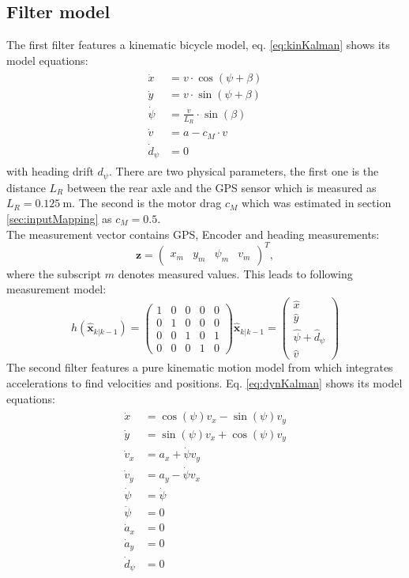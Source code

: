 \subsection{Filter model}
The first filter features a kinematic bicycle model, eq. \ref{eq:kinKalman} shows its model equations:
\begin{align}
\begin{split}\label{eq:kinKalman}
    \dot x &= v \cdot \cos (\psi + \beta)\\
    \dot y &= v \cdot \sin (\psi + \beta)\\
    \dot \psi &= \frac{v}{L_R}\cdot\sin(\beta)\\
    \dot v &= a - c_M\cdot v\\
    \dot d_\psi &= 0
\end{split}
\end{align}
with heading drift $d_\psi$.
There are two physical parameters, the first one is the distance $L_R$ between the rear axle and the GPS sensor which is measured as $L_R=\SI{0.125}{\meter}$. The second is the motor drag $c_M$ which was estimated in section \ref{sec:inputMapping} as $c_M=0.5$.\\
The measurement vector contains GPS, Encoder and heading measurements:
\begin{equation}
\bm{z} = \begin{pmatrix}
x_m&y_m&\psi_m&v_m
\end{pmatrix}^T,
\end{equation}
where the subscript $m$ denotes measured values. This leads to following measurement model:
\begin{equation}
h(\hat{\bm{x}}_{k|k-1}) = \begin{pmatrix}
1 & 0 & 0 & 0 & 0\\
0 & 1 & 0 & 0 & 0\\
0 & 0 & 1 & 0 & 1\\
0 & 0 & 0 & 1 & 0
\end{pmatrix} \hat{\bm{x}}_{k|k-1}=
\begin{pmatrix}
\hat x\\
\hat y\\
\hat \psi + \hat d_\psi\\
\hat v
\end{pmatrix}
\end{equation} 
The second filter features a pure kinematic motion model from \cite{Caron2006} which integrates accelerations to find velocities and positions. Eq. \ref{eq:dynKalman} shows its model equations:
\begin{align}
\begin{split}\label{eq:dynKalman}
    \dot x &= \cos(\psi) v_x - \sin(\psi) v_y\\
    \dot y &= \sin(\psi) v_x + \cos(\psi) v_y\\
    \dot v_x &= a_x + \dot \psi v_y\\
    \dot v_y &= a_y - \dot \psi v_x\\
    \dot \psi &= \dot \psi\\
    \ddot \psi  &= 0\\
    \dot a_x &= 0\\
    \dot a_y &= 0\\
    \dot d_\psi &= 0
\end{split}
\end{align}
